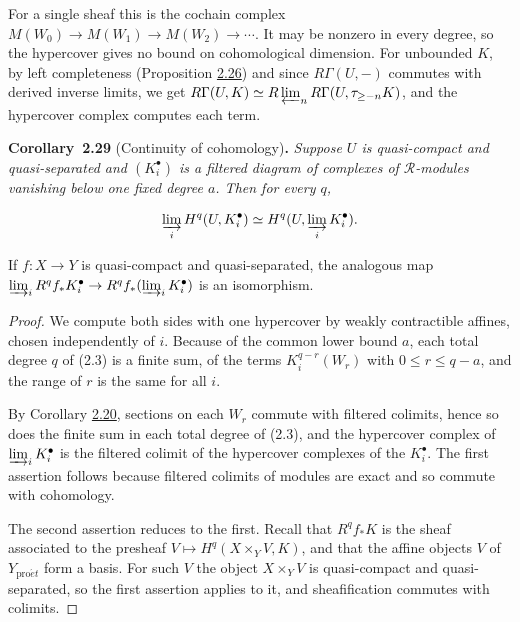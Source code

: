 \documentclass[11pt]{article}
\newenvironment{bpstatement}[2]{\par\addvspace{0.6\baselineskip}\noindent\textbf{#1}#2\textbf{.}\enspace\ignorespaces}
  {\par\addvspace{0.4\baselineskip}}
\newenvironment{bpstatementit}[2]{\begin{bpstatement}{#1}{#2}\itshape\ignorespaces}{\end{bpstatement}}
\begin{document}
\label{bp85}%
For a single sheaf this is the cochain complex \(M(W_0)\to M(W_1)\to M(W_2)\to\cdots\). It may be nonzero in every degree, so the hypercover gives no bound on cohomological dimension. For unbounded \(K\), by left completeness (Proposition \hyperref[bp77]{2.26}) and since \(R\Gamma(U,-)\) commutes with derived inverse limits, we get \(R\Gamma(U,K)\simeq
R\varprojlim_n R\Gamma(U,\tau_{\geq-n}K)\), and the hypercover complex computes each term.

\label{bp86}%
\begin{bpstatementit}{Corollary~2.29}{ (Continuity of cohomology)}
Suppose \(U\) is quasi-compact and quasi-separated and \((K_i^\bullet)\) is a filtered diagram of complexes of \(\mathcal R\)-modules vanishing below one fixed degree \(a\). Then for every \(q\),

\[
\varinjlim_i H^q(U,K_i^\bullet)
\simeq H^q(U,\varinjlim_iK_i^\bullet).
\]

If \(f:X\to Y\) is quasi-compact and quasi-separated, the analogous map \(\varinjlim_iR^qf_*K_i^\bullet\to
R^qf_*(\varinjlim_iK_i^\bullet)\) is an isomorphism.
\end{bpstatementit}

\begin{proof}[{Proof}]\label{bp87}%
We compute both sides with one hypercover by weakly contractible affines, chosen independently of \(i\). Because of the common lower bound \(a\), each total degree \(q\) of (2.3) is a finite sum, of the terms \(K_i^{q-r}(W_r)\) with \(0\leq r\leq q-a\), and the range of \(r\) is the same for all \(i\).

By Corollary \hyperref[bp59]{2.20}, sections on each \(W_r\) commute with filtered colimits, hence so does the finite sum in each total degree of (2.3), and the hypercover complex of \(\varinjlim_iK_i^\bullet\) is the filtered colimit of the hypercover complexes of the \(K_i^\bullet\). The first assertion follows because filtered colimits of modules are exact and so commute with cohomology.

The second assertion reduces to the first. Recall that \(R^qf_*K\) is the sheaf associated to the presheaf \(V\mapsto H^q(X\times_YV,K)\), and that the affine objects \(V\) of \(Y_{\mathrm{pro}\acute{e}t}\) form a basis. For such \(V\) the object \(X\times_YV\) is quasi-compact and quasi-separated, so the first assertion applies to it, and sheafification commutes with colimits.
\end{proof}
\end{document}
